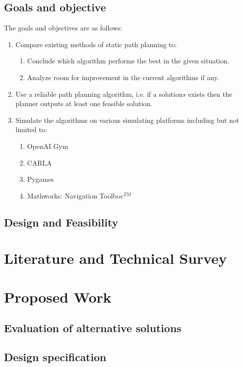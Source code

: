 \documentclass[11pt]{article}
\begin{document}
\subsection{Goals and objective}\label{Goal and objective}
The goals and objectives are as follows:
\begin{enumerate}
    \item Compare existing methods of static path planning to: 
    \begin{enumerate}
        \item Conclude which algorithm performs the best in the given situation.
        \item Analyze room for improvement in the current algorithms if any.
    \end{enumerate}
    \item Use a reliable path planning algorithm, i.e. if a solution\(s\) exists then the planner outputs at least one feasible solution.
    \item Simulate the algorithms on various simulating platforms including but not limited to:
    \begin{enumerate}
        \item OpenAI Gym 
        \item CARLA 
        \item Pygames
        \item Mathworks: Navigation Toolboc$^{TM}$
    \end{enumerate}


\end{enumerate}

\subsection{Design and Feasibility}\label{Design and Feasibility}

\section{Literature and Technical Survey}\label{Literature and Technical Survey}
\section{Proposed Work}\label{Proposed Work}
\subsection{Evaluation of alternative solutions} \label{Evaluation am}
\subsection{Design specification} \label{Design specification}
\end{document}
